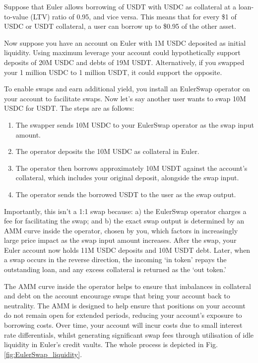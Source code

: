 \documentclass{article}
\begin{document}
Suppose that Euler allows borrowing of USDT with USDC as collateral at a loan-to-value (LTV) ratio of 0.95, and vice versa. This means that for every \$1 of USDC or USDT collateral, a user can borrow up to \$0.95 of the other asset. 

Now suppose you have an account on Euler with 1M USDC deposited as initial liquidity. Using maximum leverage your account could hypothetically support deposits of 20M USDC and debts of 19M USDT. Alternatively, if you swapped your 1 million USDC to 1 million USDT, it could support the opposite. 

To enable swaps and earn additional yield, you install an EulerSwap operator on your account to facilitate swaps. Now let’s say another user wants to swap 10M USDC for USDT. The steps are as follows:

\begin{enumerate}
    \item The swapper sends 10M USDC to your EulerSwap operator as the swap input amount.
    \item The operator deposits the 10M USDC as collateral in Euler.
    \item The operator then borrows approximately 10M USDT against the account's collateral, which includes your original deposit, alongside the swap input.
    \item The operator sends the borrowed USDT to the user as the swap output.
\end{enumerate}

\quad
Importantly, this isn’t a 1:1 swap because: a) the EulerSwap operator charges a fee for facilitating the swap; and b) the exact swap output is determined by an AMM curve inside the operator, chosen by you, which factors in increasingly large price impact as the swap input amount increases. After the swap, your Euler account now holds 11M USDC deposits and 10M USDT debt. Later, when a swap occurs in the reverse direction, the incoming `in token' repays the outstanding loan, and any excess collateral is returned as the `out token.' 

The AMM curve inside the operator helps to ensure that imbalances in collateral and debt on the account encourage swaps that bring your account back to neutrality. The AMM is designed to help ensure that positions on your account do not remain open for extended periods, reducing your account's exposure to borrowing costs. Over time, your account will incur costs due to small interest rate differentials, whilst generating significant swap fees through utilisation of idle liquidity in Euler's credit vaults. The whole process is depicted in Fig. \ref{fig:EulerSwap_liquidity}.
\end{document}
